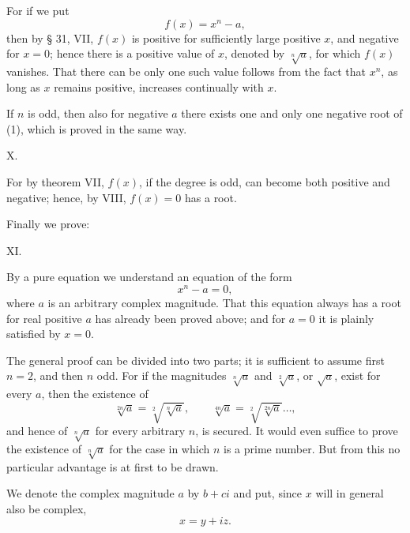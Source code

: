 
For if we put
\begin{equation}
 f(x)=x^n-a,
\tag{1}
\end{equation}
then by § 31, VII, $f(x)$ is positive for sufficiently large positive $x$, and negative for $x=0$; hence there is a positive value of $x$, denoted by $\sqrt[n]{a}$, for which $f(x)$ vanishes. That there can be only one such value follows from the fact that $x^n$, as long as $x$ remains positive, increases continually with $x$.

If $n$ is odd, then also for negative $a$ there exists one and only one negative root of (1), which is proved in the same way.

\medskip
\noindent X. 
\medskip

For by theorem VII, $f(x)$, if the degree is odd, can become both positive and negative; hence, by VIII, $f(x)=0$ has a root.

Finally we prove:

\medskip
\noindent XI. 
\medskip

By a pure equation we understand an equation of the form
\begin{equation}
 x^n-a=0,
\tag{2}
\end{equation}
where $a$ is an arbitrary complex magnitude. That this equation always has a root for real positive $a$ has already been proved above; and for $a=0$ it is plainly satisfied by $x=0$.

The general proof can be divided into two parts; it is sufficient to assume first $n=2$, and then $n$ odd. For if the magnitudes $\sqrt[n]{a}$ and $\sqrt[2]{a}$, or $\sqrt{a}$, exist for every $a$, then the existence of
\[
 \sqrt[2n]{a}=\sqrt[2]{\sqrt[n]{a}},\qquad \sqrt[4n]{a}=\sqrt[2]{\sqrt[2n]{a}}\ldots,
\]
and hence of $\sqrt[n]{a}$ for every arbitrary $n$, is secured. It would even suffice to prove the existence of $\sqrt[n]{a}$ for the case in which $n$ is a prime number. But from this no particular advantage is at first to be drawn.

We denote the complex magnitude $a$ by $b+ci$ and put, since $x$ will in general also be complex,
\[
 x=y+iz.
\]
